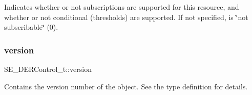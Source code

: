 Indicates whether or not subscriptions are supported for this resource, and whether or not conditional (thresholds) are supported. If not specified, is \char`\"{}not subscribable\char`\"{} (0). \mbox{\label{group__DERControl_gaa5a815f8a9d72a61d295548d8ef878d5}} 
\subsubsection{\texorpdfstring{version}{version}}
{\footnotesize\ttfamily S\+E\+\_\+\+D\+E\+R\+Control\+\_\+t\+::version}

Contains the version number of the object. See the type definition for details. 